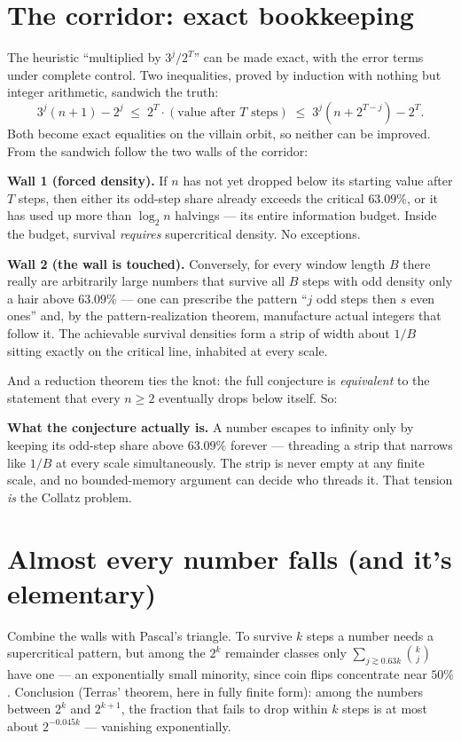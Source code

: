 \documentclass[11pt]{article}
\begin{document}
\section{The corridor: exact bookkeeping}

The heuristic ``multiplied by $3^j/2^T$'' can be made exact, with the
error terms under complete control. Two inequalities, proved by
induction with nothing but integer arithmetic, sandwich the truth:
\[
3^j(n+1) - 2^j \;\le\; 2^T \cdot (\text{value after } T \text{ steps})
\;\le\; 3^j (n + 2^{T-j}) - 2^T .
\]
Both become exact equalities on the villain orbit, so neither can be
improved. From the sandwich follow the two walls of the corridor:

\textbf{Wall 1 (forced density).} If $n$ has not yet dropped below its
starting value after $T$ steps, then either its odd-step share already
exceeds the critical $63.09\%$, or it has used up more than $\log_2 n$
halvings --- its entire information budget. Inside the budget, survival
\emph{requires} supercritical density. No exceptions.

\textbf{Wall 2 (the wall is touched).} Conversely, for every window
length $B$ there really are arbitrarily large numbers that survive all
$B$ steps with odd density only a hair above $63.09\%$ --- one can
prescribe the pattern ``$j$ odd steps then $s$ even ones'' and, by the
pattern-realization theorem, manufacture actual integers that follow it.
The achievable survival densities form a strip of width about $1/B$
sitting exactly on the critical line, inhabited at every scale.

And a reduction theorem ties the knot: the full conjecture is
\emph{equivalent} to the statement that every $n \ge 2$ eventually drops
below itself. So:

\begin{keyidea}
\textbf{What the conjecture actually is.} A number escapes to infinity
only by keeping its odd-step share above $63.09\%$ forever ---
threading a strip that narrows like $1/B$ at every scale
simultaneously. The strip is never empty at any finite scale, and no
bounded-memory argument can decide who threads it. That tension
\emph{is} the Collatz problem.
\end{keyidea}

\section{Almost every number falls (and it's elementary)}

Combine the walls with Pascal's triangle. To survive $k$ steps a number
needs a supercritical pattern, but among the $2^k$ remainder classes
only $\sum_{j \gtrsim 0.63k} \binom{k}{j}$ have one --- an exponentially
small minority, since coin flips concentrate near $50\%$. Conclusion
(Terras' theorem, here in fully finite form): among the numbers between
$2^k$ and $2^{k+1}$, the fraction that fails to drop within $k$ steps is
at most about $2^{-0.045k}$ --- vanishing exponentially.
\end{document}
